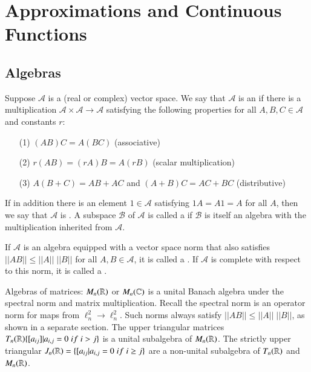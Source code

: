 \chapter{Approximations and Continuous Functions}

\section{Algebras}

\begin{defn}
    Suppose $\mathcal{A}$ is a (real or complex) vector space. We say that $\mathcal{A}$ is an  if there is a multiplication $\mathcal{A}\times \mathcal{A}\rightarrow \mathcal{A}$ satisfying the following properties for all $A,B,C \in \mathcal{A}$ and constants $r$: \begin{itemize}
        \item[(1)] $(AB)C = A(BC)$ (associative)
        \item[(2)] $r(AB) = (rA)B = A(rB)$ (scalar multiplication)
        \item[(3)] $A(B+C) = AB+AC$ and $(A+B)C = AC+BC$ (distributive)
    \end{itemize}
    If in addition there is an element $1 \in \mathcal{A}$ satisfying $1A = A1 = A$ for all $A$, then we say that $\mathcal{A}$ is . A subspace $\mathcal{B}$ of $\mathcal{A}$ is called a  if $\mathcal{B}$ is itself an algebra with the multiplication inherited from $\mathcal{A}$.
\end{defn}

\begin{defn}
    If $\mathcal{A}$ is an algebra equipped with a vector space norm that also satisfies $||AB||\leq ||A||\;||B||$ for all $A,B \in \mathcal{A}$, it is called a . If $\mathcal{A}$ is complete with respect to this norm, it is called a .
\end{defn}

\begin{eg}
    Algebras of matrices: $M_n(\mathbb R)$ or $M_n(\mathbb C)$ is a unital Banach algebra under the spectral norm and matrix multiplication. Recall the spectral norm is an operator norm for maps from $\ell_n^2\rightarrow \ell_n^2$. Such norms always satisfy $||AB|| \leq ||A||\;||B||$, as shown in a separate section. The upper triangular matrices $T_n(\mathbb R)\{[a_{ij}]\vert a_{i,j} = 0\;if\; i > j\}$ is a unital subalgebra of $M_n(\mathbb R)$. The strictly upper triangular $J_n(\mathbb R) = \{[a_{ij}\vert a_{i,j} = 0\;if\;i\geq j\}$ are a non-unital subalgebra of $T_n(\mathbb R)$ and $M_n(\mathbb R)$.
\end{eg}

